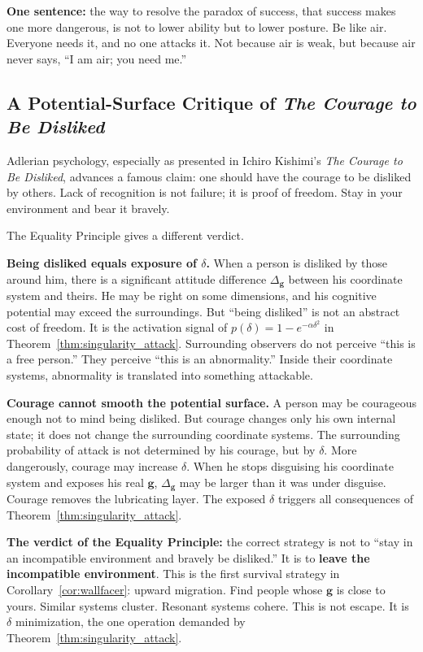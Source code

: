 \documentclass[12pt,a4paper]{article}
\theoremstyle{remark}
\begin{document}
\textbf{One sentence:} the way to resolve the paradox of success, that success makes one more dangerous, is not to lower ability but to lower posture. Be like air. Everyone needs it, and no one attacks it. Not because air is weak, but because air never says, ``I am air; you need me.''

\subsection{A Potential-Surface Critique of \textit{The Courage to Be Disliked}}

Adlerian psychology, especially as presented in Ichiro Kishimi's \textit{The Courage to Be Disliked}, advances a famous claim: one should have the courage to be disliked by others. Lack of recognition is not failure; it is proof of freedom. Stay in your environment and bear it bravely.

The Equality Principle gives a different verdict.

\textbf{Being disliked equals exposure of $\delta$.} When a person is disliked by those around him, there is a significant attitude difference $\Delta_{\mathbf{g}}$ between his coordinate system and theirs. He may be right on some dimensions, and his cognitive potential may exceed the surroundings. But ``being disliked'' is not an abstract cost of freedom. It is the activation signal of $p(\delta) = 1 - e^{-\alpha\delta^2}$ in Theorem~\ref{thm:singularity_attack}. Surrounding observers do not perceive ``this is a free person.'' They perceive ``this is an abnormality.'' Inside their coordinate systems, abnormality is translated into something attackable.

\textbf{Courage cannot smooth the potential surface.} A person may be courageous enough not to mind being disliked. But courage changes only his own internal state; it does not change the surrounding coordinate systems. The surrounding probability of attack is not determined by his courage, but by $\delta$. More dangerously, courage may increase $\delta$. When he stops disguising his coordinate system and exposes his real $\mathbf{g}$, $\Delta_{\mathbf{g}}$ may be larger than it was under disguise. Courage removes the lubricating layer. The exposed $\delta$ triggers all consequences of Theorem~\ref{thm:singularity_attack}.

\textbf{The verdict of the Equality Principle:} the correct strategy is not to ``stay in an incompatible environment and bravely be disliked.'' It is to \textbf{leave the incompatible environment}. This is the first survival strategy in Corollary~\ref{cor:wallfacer}: upward migration. Find people whose $\mathbf{g}$ is close to yours. Similar systems cluster. Resonant systems cohere. This is not escape. It is $\delta$ minimization, the one operation demanded by Theorem~\ref{thm:singularity_attack}.
\end{document}
